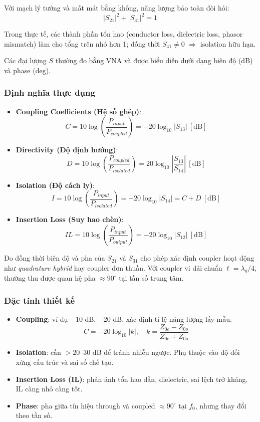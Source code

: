 Với mạch lý tưởng và mất mát bằng không, năng lượng bảo toàn đòi hỏi:
\[
|S_{21}|^2+|S_{31}|^2=1
\]

Trong thực tế, các thành phần tổn hao (conductor loss, dielectric loss, phasor mismatch) làm cho tổng trên nhỏ hơn 1; đồng thời $S_{41}\neq 0$ $\Rightarrow$ isolation hữu hạn.

Các đại lượng $S$ thường đo bằng VNA và được biểu diễn dưới dạng biên độ (dB) và phase (deg).

\subsubsection{Định nghĩa thực dụng}

\begin{itemize}[label=-]
	\item \textbf{Coupling Coefficients (Hệ số ghép)}:
	\[
	C=10\log{\left(\frac{P_{input}}{P_{coupled}}\right)}=-20\log_{10}\left|S_{13}\right| \ [\mathrm{dB}]
	\]
	
	\item \textbf{Directivity (Độ định hướng)}:
	\[
	D=10\log{\left(\frac{P_{coupled}}{P_{isolated}}\right)}=20\log_{10}\left|\frac{S_{13}}{S_{14}}\right| \ [\mathrm{dB}]
	\]
	
	\item \textbf{Isolation (Độ cách ly)}:
	\[
	I=10\log{\left(\frac{P_{input}}{P_{isolated}}\right)}=-20\log_{10}\left|S_{14}\right|=C+D \ [\mathrm{dB}]
	\]
	
	\item \textbf{Insertion Loss (Suy hao chèn)}:
	\[
	IL=10\log{\left(\frac{P_{input}}{P_{output}}\right)}=-20\log_{10}\left|S_{12}\right| \ [\mathrm{dB}]
	\]
\end{itemize}

Đo đồng thời biên độ và pha của $S_{21}$ và $S_{31}$ cho phép xác định coupler hoạt động như \textit{quadrature hybrid} hay coupler đơn thuần. Với coupler vi dải chuẩn $\ell=\lambda_g/4$, thường thu được quan hệ pha $\approx 90^\circ$ tại tần số trung tâm.

\subsubsection{Đặc tính thiết kế}

\begin{itemize}[label=-]
	\item \textbf{Coupling}: ví dụ $-10$ dB, $-20$ dB, xác định tỉ lệ năng lượng lấy mẫu.
	\[
	C=-20\log_{10}|k|,\quad k=\frac{Z_{0e}-Z_{0o}}{Z_{0e}+Z_{0o}}
	\]
	
	\item \textbf{Isolation}: cần $>20$–$30$ dB để tránh nhiễu ngược. Phụ thuộc vào độ đối xứng cấu trúc và sai số chế tạo.
	
	\item \textbf{Insertion Loss (IL)}: phản ánh tổn hao dẫn, dielectric, sai lệch trở kháng. IL càng nhỏ càng tốt.
	
	\item \textbf{Phase}: pha giữa tín hiệu through và coupled $\approx 90^\circ$ tại $f_0$, nhưng thay đổi theo tần số.
\end{itemize}

